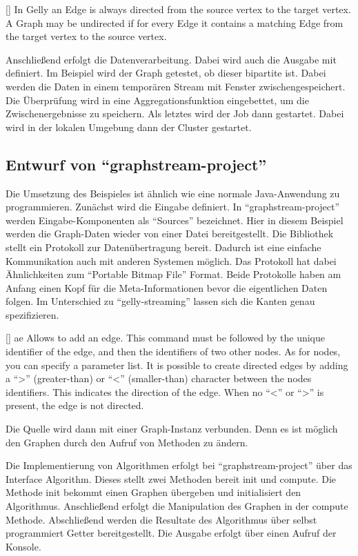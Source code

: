 [\cite{Foundation2018}]{
In Gelly an Edge is always directed from the source vertex to the target vertex.
A Graph may be undirected if for every Edge it contains a matching Edge from the
target vertex to the source vertex.}

Anschließend erfolgt die Datenverarbeitung. Dabei wird auch die Ausgabe mit
definiert. Im Beispiel wird der Graph getestet, ob dieser bipartite ist. Dabei
werden die Daten in einem temporären Stream mit Fenster zwischengespeichert. Die
Überprüfung wird in eine Aggregationsfunktion eingebettet, um die
Zwischenergebnisse zu speichern. Als letztes wird der Job dann gestartet. Dabei
wird in der lokalen Umgebung dann der Cluster gestartet.

\subsection{Entwurf von \enquote{graphstream-project}}
Die Umsetzung des Beispieles ist ähnlich wie eine normale Java-Anwendung zu
programmieren. Zunächst wird die Eingabe definiert. In \enquote{graphstream-project}
werden Eingabe-Komponenten als \enquote{Sources} bezeichnet. Hier in diesem
Beispiel werden die Graph-Daten wieder von einer Datei bereitgestellt. Die
Bibliothek stellt ein Protokoll zur Datenübertragung bereit. Dadurch ist eine
einfache Kommunikation auch mit anderen Systemen möglich. Das Protokoll hat dabei
Ähnlichkeiten zum \enquote{Portable Bitmap File} Format. Beide Protokolle haben
am Anfang einen Kopf für die Meta-Informationen bevor die eigentlichen Daten
folgen. Im Unterschied zu \enquote{gelly-streaming} lassen sich die Kanten
genau spezifizieren.

[\cite{Team2018}]{
ae Allows to add an edge. This command must be followed by the unique identifier
of the edge, and then the identifiers of two other nodes. As for nodes, you can
specify a parameter list. It is possible to create directed edges by adding a
“>” (greater-than) or “<” (smaller-than) character between the nodes identifiers.
This indicates the direction of the edge. When no “<” or “>” is present, the
edge is not directed.}

Die Quelle wird dann mit einer Graph-Instanz verbunden. Denn es ist möglich
den Graphen durch den Aufruf von Methoden zu ändern.

Die Implementierung von Algorithmen erfolgt bei \enquote{graphstream-project}
über das Interface Algorithm. Dieses stellt zwei Methoden bereit init und compute.
Die Methode init bekommt einen Graphen übergeben und initialisiert den Algorithmus.
Anschließend erfolgt die Manipulation des Graphen in der compute Methode.
Abschließend werden die Resultate des Algorithmus über selbst programmiert
Getter bereitgestellt. Die Ausgabe erfolgt über einen Aufruf der Konsole.

